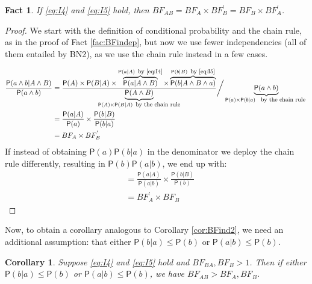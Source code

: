 \documentclass[
  10pt,
  dvipsnames,enabledeprecatedfontcommands]{scrartcl}
\newtheorem{fact}{Fact}
\newcommand{\et}{\wedge}
\newcommand{\pr}[1]{\ensuremath{\mathsf{P}(#1)}}
\newtheorem{corollary}{Corollary}[fact]
\begin{document}
\begin{fact} If \eqref{eq:I4} and \eqref{eq:I5}  hold, then $BF_{AB} =  BF_{A}\times BF^{'}_{B}  = BF_{B} \times BF^{'}_{A}$. \label{fac:BFdep}
\end{fact}

\begin{proof}

We start with the definition of conditional probability and the chain rule, as in the proof of Fact \ref{fac:BFindep}, but now we use fewer  independencies (all of them entailed by \textsf{BN2}), as we use the chain rule instead in a few cases. 

 \begin{align*}
\frac{\pr{a \wedge b\vert A\wedge B}}{\pr{a \wedge b}} &
= \frac{\pr{A} \times \pr {B \vert A}  \times
\overbrace{\pr{a \vert A \et B}}^{\pr{a \vert A} \mbox{\footnotesize \, by \eqref{eq:I4}}}
\times \overbrace{\pr{b \vert A \et B \et a}}^{\pr{b \vert B} \mbox{\footnotesize \, by \eqref{eq:I5}}}
}{\underbrace{\pr{A \et B}}_{\pr{A} \times \pr{B\vert A} \mbox{\footnotesize \, by the chain rule}}} \bigg/ \underbrace{\pr{a \wedge b}}_{\pr{a}\times \pr{b\vert a} \mbox{ \footnotesize \, by the chain rule }}\\
& = \frac{\pr{a \vert A}}{\pr{a}} \times \frac{\pr{b\vert B}}{\pr{b \vert a}}\\
& = BF_{A} \times BF^{'}_{B}
\end{align*}
If instead of obtaining $\pr{a}\pr{b \vert a}$ in the denominator we deploy the chain rule differently, resulting in $\pr{b}\pr{a \vert b}$, we end up with:
\begin{align*}
& = \frac{\pr{a \vert A}}{\pr{a \vert b}} \times \frac{\pr{b\vert B}}{\pr{b}}\\
& = BF^{'}_{A} \times BF_{B}
\end{align*}

\end{proof}

Now, to obtain a corollary analogous to Corollary \ref{cor:BFind2}, we
need an additional assumption: that either \(\pr{b\vert a} \leq \pr{b}\)
or \(\pr{a \vert b} \leq \pr{b}\).

\begin{corollary} Suppose \eqref{eq:I4} and \eqref{eq:I5}  hold and $BF_{BA}, BF_{B} >1$. 
Then if either $\pr{b\vert a} \leq \pr{b}$ or \linebreak  $\pr{a \vert b} \leq \pr{b}$, we have $BF_{AB}> BF_{A}, BF_{B}$.
\end{corollary}
\end{document}

